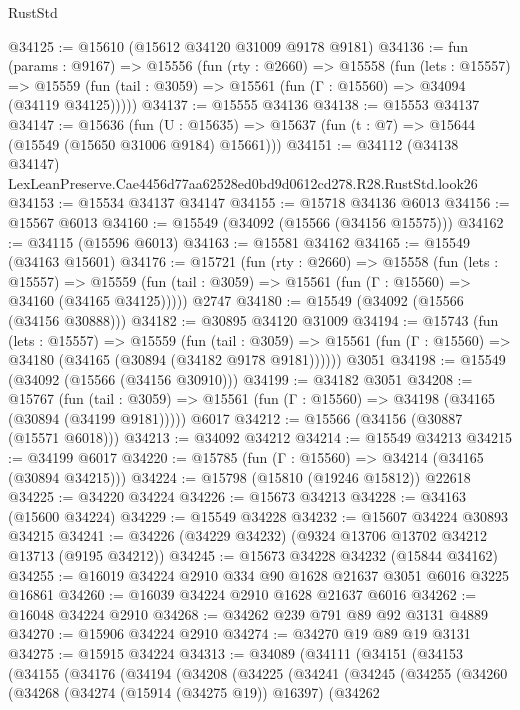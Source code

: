 \begin{lexlean}{RustStd}
\begin{coremodule}
@34125 := @15610 (@15612 @34120 @31009 @9178 @9181)
@34136 := fun (params : @9167) =>
  @15556
    (fun (rty : @2660) =>
    @15558
      (fun (lets : @15557) =>
      @15559 (fun (tail : @3059) => @15561 (fun (Γ : @15560) => @34094 (@34119 @34125)))))
@34137 := @15555 @34136
@34138 := @15553 @34137
@34147 := @15636
    (fun (U : @15635) => @15637 (fun (t : @7) => @15644 (@15549 (@15650 @31006 @9184) @15661)))
@34151 := @34112
    (@34138 @34147)
    LexLeanPreserve.Cae4456d77aa62528ed0bd9d0612cd278.R28.RustStd.look26
@34153 := @15534 @34137 @34147
@34155 := @15718 @34136 @6013
@34156 := @15567 @6013
@34160 := @15549 (@34092 (@15566 (@34156 @15575)))
@34162 := @34115 (@15596 @6013)
@34163 := @15581 @34162
@34165 := @15549 (@34163 @15601)
@34176 := @15721
    (fun (rty : @2660) =>
    @15558
      (fun (lets : @15557) =>
      @15559 (fun (tail : @3059) => @15561 (fun (Γ : @15560) => @34160 (@34165 @34125)))))
    @2747
@34180 := @15549 (@34092 (@15566 (@34156 @30888)))
@34182 := @30895 @34120 @31009
@34194 := @15743
    (fun (lets : @15557) =>
    @15559
      (fun (tail : @3059) =>
      @15561 (fun (Γ : @15560) => @34180 (@34165 (@30894 (@34182 @9178 @9181))))))
    @3051
@34198 := @15549 (@34092 (@15566 (@34156 @30910)))
@34199 := @34182 @3051
@34208 := @15767
    (fun (tail : @3059) => @15561 (fun (Γ : @15560) => @34198 (@34165 (@30894 (@34199 @9181)))))
    @6017
@34212 := @15566 (@34156 (@30887 (@15571 @6018)))
@34213 := @34092 @34212
@34214 := @15549 @34213
@34215 := @34199 @6017
@34220 := @15785 (fun (Γ : @15560) => @34214 (@34165 (@30894 @34215)))
@34224 := @15798 (@15810 (@19246 @15812)) @22618
@34225 := @34220 @34224
@34226 := @15673 @34213
@34228 := @34163 (@15600 @34224)
@34229 := @15549 @34228
@34232 := @15607 @34224 @30893 @34215
@34241 := @34226 (@34229 @34232) (@9324 @13706 @13702 @34212 @13713 (@9195 @34212))
@34245 := @15673 @34228 @34232 (@15844 @34162)
@34255 := @16019 @34224 @2910 @334 @90 @1628 @21637 @3051 @6016 @3225 @16861
@34260 := @16039 @34224 @2910 @1628 @21637 @6016
@34262 := @16048 @34224 @2910
@34268 := @34262 @239 @791 @89 @92 @3131 @4889
@34270 := @15906 @34224 @2910
@34274 := @34270 @19 @89 @19 @3131
@34275 := @15915 @34224
@34313 := @34089
    (@34111
      (@34151
        (@34153
          (@34155
            (@34176
              (@34194
                (@34208
                  (@34225
                    (@34241
                      (@34245
                        (@34255
                          (@34260
                            (@34268
                              (@34274 (@15914 (@34275 @19)) @16397)
                              (@34262

\end{coremodule}
\end{lexlean}
